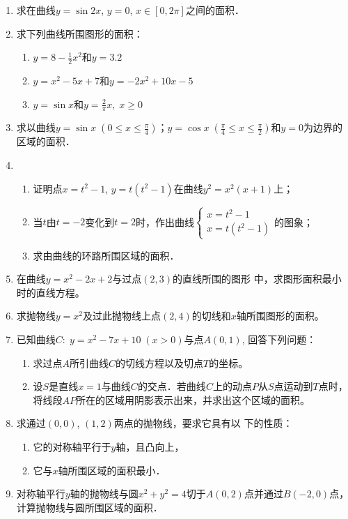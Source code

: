 \begin{ex}
\begin{enumerate}
    \item 求在曲线$y=\sin2x$, $y=0$, $x\in[0, 2\pi]$之间的面积．
    \item 求下列曲线所围图形的面积：
\begin{enumerate}
    \item $y=8-\frac{1}{2}x^2$和$y=3.2$ 
    \item $y=x^2-5x+7$和$y=-2x^2+10x-5$
    \item $y=\sin x$和$y=\frac{2}{\pi} x,\; x\ge 0$
\end{enumerate}
\item 求以曲线$y=\sin x\; \left(0\le x\le \frac{\pi}{4}\right)$；$y=\cos x\; \left(\frac{\pi}{4}\le x\le \frac{\pi}{2}\right)$和$y=0$为边界的区域的面积．

\item \begin{enumerate}
    \item 证明点$x=t^2-1$, $y=t(t^2-1)$在曲线$y^2=x^2(x+1)$上；
    \item 当$t$由$t=-2$变化到$t=2$时，作出曲线$\begin{cases}
        x=t^2-1\\x=t (t^2-1)
    \end{cases}$的图象；
\item 求由曲线的环路所围区域的面积．
\end{enumerate}

\item 在曲线$y=x^2-2x+2$与过点$(2, 3)$的直线所围的图形
中，求图形面积最小时的直线方程。
\item 求抛物线$y=x^2$及过此抛物线上点$(2, 4)$的切线和$x$轴所围图形的面积。
\item 已知曲线$C:\; y=x^2-7x+10\; (x>0)$与点$A(0, 1)$, 
回答下列问题：
\begin{enumerate}
    \item 求过点$A$所引曲线$C$的切线方程以及切点$T$的坐标。
    \item 设$S$是直线$x=1$与曲线$C$的交点．若曲线$C$上的动点$P$从$S$点运动到$T$点时，将线段$AP$所在的区域用阴影表示出来，并求出这个区域的面积。
\end{enumerate}

\item 求通过$(0, 0)$, $(1, 2)$两点的抛物线，要求它具有以
下的性质：
\begin{enumerate}
    \item 它的对称轴平行于$y$轴，且凸向上，
    \item 它与$x$轴所围区域的面积最小．
\end{enumerate}

\item 对称轴平行$y$轴的抛物线与圆$x^2+y^2=4$切于$A(0, 2)$点并通过$B(-2, 0)$点，计算抛物线与圆所围区域的面积．
\end{enumerate}
\end{ex}

